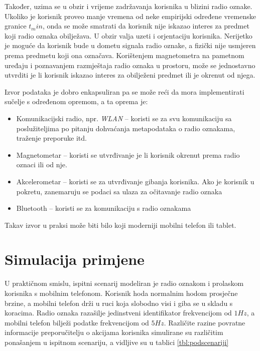 \documentclass[times, utf8, diplomski, numeric]{fer}
\begin{document}
Također, uzima se u obzir i vrijeme zadržavanja korisnika u blizini radio
oznake. Ukoliko je korisnik proveo manje vremena od neke empirijski određene
vremenske granice $t_min$, onda se može smatrati da korisnik nije iskazao
interes za predmet koji radio oznaka obilježava.
U obzir valja uzeti i orjentaciju korisnika. Nerijetko je moguće da korisnik
bude u dometu signala radio oznake, a fizički nije usmjeren prema predmetu koji
ona označava. Korištenjem magnetometra na pametnom uređaju i poznavanjem
razmještaja radio oznaka u prostoru, može se jednostavno utvrditi je li korisnik
iskazao interes za obilježeni predmet ili je okrenut od njega.

Izvor podataka je dobro enkapsuliran pa se može reći da mora implementirati
sučelje s određenom opremom, a ta oprema je:
\begin{itemize}
  \item Komunikacijski radio, npr. \emph{WLAN}  -- koristi
  se za svu komunikaciju sa poslužiteljima po pitanju dohvaćanja metapodataka o
  radio oznakama, traženje preporuke itd.
  \item Magnetometar -- koristi se utvrđivanje je li korisnik okrenut prema
  radio oznaci ili od nje. %
  \item Akcelerometar -- koristi se za utvrđivanje gibanja korisnika. Ako je
  korisnik u pokretu, zanemaruju se podaci sa ulaza za očitavanje radio oznaka
  \item Bluetooth -- koristi se za komunikaciju s radio oznakama
\end{itemize}

Takav izvor u praksi može biti bilo koji moderniji mobilni telefon ili tablet.

\section{Simulacija primjene}
U praktičnom smislu, ispitni scenarij modeliran je radio oznakom i prolaskom
korisnika s mobilnim telefonom. Korisnik hoda normalnim hodom prosječne brzine,
a mobilni telefon drži u ruci koja slobodno visi i giba se u skladu s koracima.
Radio oznaka razašilje jedinstveni identifikator frekvencijom od $1 Hz$, a
mobilni telefon bilježi podatke frekvencijom od $5 Hz$. Različite razine
povratne informacije preporučitelju o akcijama korisnika simulirane su
različitim ponašanjem u ispitnom scenariju, a vidljive su u tablici
\ref{tbl:podscenariji}
\end{document}
